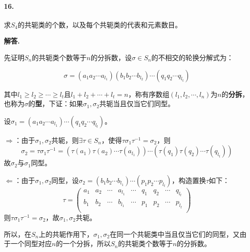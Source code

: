 \documentclass[12pt, a4paper, oneside]{ctexart}
\newenvironment{solution}{\par\noindent\textbf{解答. }}{\bigskip\par}
\begin{document}
\paragraph{16.}求$S_4$的共轭类的个数，以及每个共轭类的代表和元素数目。

\begin{solution}
    
    先证明$S_n$的共轭类个数等于$n$的分拆数，设$\sigma\in S_n$的不相交的轮换分解式为：

    \begin{equation*}
        \sigma=(a_1a_2\cdots a_{l_1})(b_1b_2\cdots b_{l_2})\cdots(q_1q_2\cdots q_{l_t})
    \end{equation*}

    其中$l_1\geqslant l_2\geqslant \cdots\geqslant l_t$且$l_1+l_2+\cdots+l_t = n$，称有序数组$(l_1,l_2,\cdots, l_n)$为$n$的\textbf{分拆}，也称为$\sigma$的\textbf{型}，下证：如果$\sigma_1,\sigma_2$共轭当且仅当它们同型。

    设$\sigma_1 =(a_1a_2\cdots a_{l_1})\cdots(q_1q_2\cdots q_{l_t})$。

    $\Rightarrow$：由于$\sigma_1,\sigma_2$共轭，则$\exists \tau\in S_n$，使得$\tau\sigma_1\tau^{-1}=\sigma_2$，则
    \begin{equation*}
        \sigma_2 = \tau\sigma_1\tau^{-1}=(\tau(a_1)\tau(a_2)\cdots \tau(a_{l_1}))\cdots(\tau(q_1)\tau(q_2)\cdots \tau(q_{l_t}))
    \end{equation*}
    故$\sigma_2$与$\sigma_1$同型。

    $\Leftarrow$：由于$\sigma_1,\sigma_2$同型，设$\sigma_2 =(b_1b_2\cdots b_{l_1})\cdots(p_1p_2\cdots p_{l_t})$，构造置换$\tau$如下：
    \begin{equation*}
        \tau = \begin{pmatrix}
            a_1&a_2&\cdots&a_{l_1}&\cdots&q_1&q_2&\cdots&q_{l_t}\\
            b_1&b_2&\cdots&b_{l_1}&\cdots&p_1&p_2&\cdots&p_{l_t}\\
        \end{pmatrix}
    \end{equation*}
    则$\tau\sigma_1\tau^{-1} = \sigma_2$，故$\sigma_1,\sigma_2$共轭。

    所以，在$S_n$上的共轭作用下，$\sigma_1,\sigma_2$在同一个共轭类中当且仅当它们的同型，又由于一个同型对应$n$的一个分拆，所以$S_n$的共轭类个数等于$n$的分拆数。


\end{solution}
\end{document}
